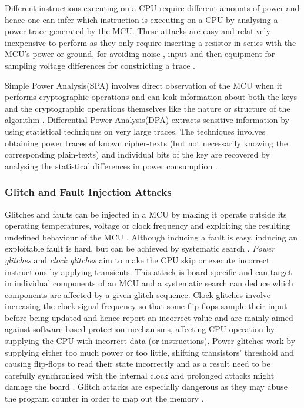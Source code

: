 	Different instructions executing on a CPU require different amounts of power \citep{website:riscure} \citep{kocher:DPA} and hence one can infer which instruction is executing on a CPU by analysing a power trace generated by the MCU. These attacks are easy and relatively inexpensive to perform as they only require inserting a resistor in series with the MCU's power or ground, for avoiding noise \citep{sergei:thesis}, input and then equipment for sampling voltage differences for constricting a trace \citep{kocher:DPA}. 

Simple Power Analysis(SPA) involves direct observation of the MCU when it performs cryptographic operations and can leak information about both the keys and the cryptographic operations themselves like the nature or structure of the algorithm \citep{kocher:DPA} \citep{anderson:tamper_resistance}. Differential Power Analysis(DPA) extracts sensitive information by using statistical techniques on very large traces. The techniques involves obtaining power traces of known cipher-texts (but not necessarily knowing the corresponding plain-texts) and individual bits of the key are recovered by analysing the statistical differences in power consumption \citep{kocher:DPA} \citep{anderson:tamper_resistance}.

	\subsubsection{Glitch and Fault Injection Attacks}
	Glitches and faults can be injected in a MCU by making it operate outside its operating temperatures, voltage or clock frequency and exploiting the resulting undefined behaviour of the MCU \citep{sergei:thesis} \citep{avr_mega}. Although inducing a fault is easy, inducing an exploitable fault is hard, but can be achieved by systematic search \citep{sergei:thesis} \citep{glitches_paper} \citep{website:riscure}. \emph{Power glitches} and \emph{clock glitches} aim to make the CPU skip or execute incorrect instructions by applying transients. This attack is board-specific and can target in individual components of an MCU and a systematic search can deduce which components are affected by a given glitch sequence. Clock glitches involve increasing the clock signal frequency so that some flip flops sample their input before being updated and hence report an incorrect value \citep{sergei:thesis} and are mainly aimed against software-based protection mechanisms, affecting CPU operation by supplying the CPU with incorrect data (or instructions). Power glitches work by supplying either too much power or too little, shifting transistors' threshold and causing flip-flops to read their state incorrectly and as a result need to be carefully synchronised with the internal clock and prolonged attacks might damage the board \citep{sergei:thesis}. Glitch attacks are especially dangerous as they may abuse the program counter in order to map out the memory \citep{glitches_paper} \citep{anderson:cautionary_note} \citep{sergei:thesis}.

